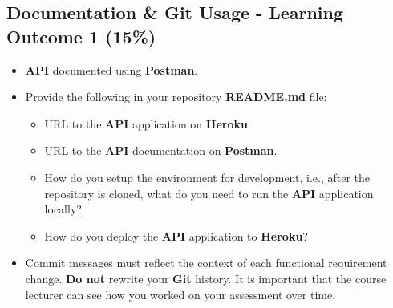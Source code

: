 \documentclass{article}
\begin{document}
\subsection*{Documentation \& Git Usage - Learning Outcome 1 (15\%)}
\begin{itemize}
  \item \textbf{API} documented using \textbf{Postman}.
    \item Provide the following in your repository \textbf{README.md} file:
          \begin{itemize}
              \item URL to the \textbf{API} application on \textbf{Heroku}.
              \item URL to the \textbf{API} documentation on \textbf{Postman}.
              \item How do you setup the environment for development, i.e., after the repository is cloned, what do you need to run the \textbf{API} application locally?
                    \item How do you deploy the \textbf{API} application to \textbf{Heroku}?
          \end{itemize}
            \end{itemize}
            \begin{itemize}
    \item Commit messages must reflect the context of each functional requirement change. \textbf{Do not} rewrite your \textbf{Git} history. It is important that the course lecturer can see how you worked on your assessment over time.
\end{itemize}
\end{document}

